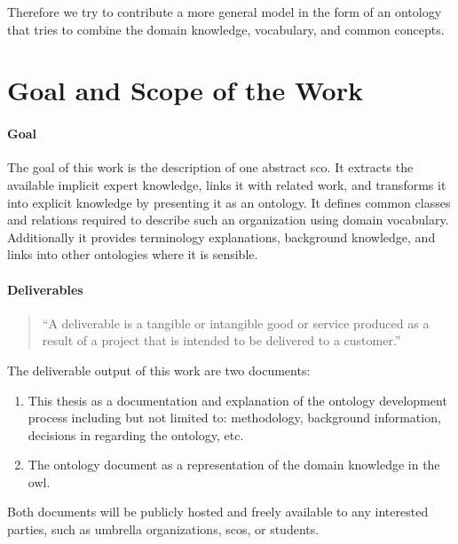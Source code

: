 \documentclass[a4paper, DIV=13, BCOR=0cm]{scrbook}
\begin{document}
Therefore we try to contribute a more general model in the form of an ontology that tries to combine the domain knowledge, vocabulary, and common concepts.

\section{Goal and Scope of the Work}
\label{goal}
\paragraph{Goal}
The goal of this work is the description of one abstract \gls{sco}. It extracts the available implicit expert knowledge, links it with related work, and transforms it into explicit  knowledge by presenting it as an ontology. It defines common classes and relations required to describe such an organization using domain vocabulary. Additionally it provides terminology explanations, background knowledge, and links into other ontologies where it is sensible.

\paragraph{Deliverables}
\begin{quote}
	\enquote{A deliverable is a tangible or intangible good or service produced as a result of a project that is intended to be delivered to a customer.} \cite{deliverable}
\end{quote}

The deliverable output of this work are two documents:
\begin{enumerate}
	\item This thesis as a documentation and explanation of the ontology development process including but not limited to: methodology, background information, decisions in regarding the ontology, etc.
	\item The ontology document as a representation of the domain knowledge in the \gls{owl}.
\end{enumerate}

Both documents will be publicly hosted and freely available to any interested parties, such as umbrella organizations, \glspl{sco}, or students.
\end{document}
